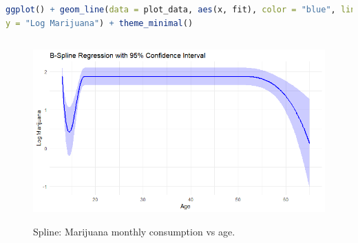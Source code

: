 \begin{enumerate}[leftmargin=*]
\begin{tcolorbox}[enhanced,width=4.67in,center upper,
	fontupper=\large\bfseries,drop shadow southwest,sharp corners]
\begin{VF}
\begin{lstlisting}[language=R]
ggplot() + geom_line(data = plot_data, aes(x, fit), color = "blue", linewidth = 1) + geom_ribbon(data = plot_data, aes(x, ymin = liminf, ymax = limsup), fill = "blue", alpha = 0.2) + labs(title = "B-Spline Regression with 95% Confidence Interval", x = "Age",
y = "Log Marijuana") + theme_minimal()
\end{lstlisting}
	\end{VF}
\end{tcolorbox}

\begin{figure}[!h]
	\includegraphics[width=340pt, height=200pt]{Chapters/chapter11/figures/AgeMarijuana.png}
	\caption[List of figure caption goes here]{Spline: Marijuana monthly consumption vs age.}\label{figAgeMarijuana}
\end{figure}

\end{enumerate}